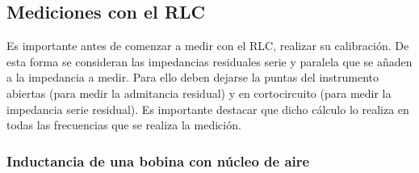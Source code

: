 \documentclass[a4paper,10pt]{article}
\begin{document}
	\subsection{Mediciones con el RLC}		
		\indent Es importante antes de comenzar a medir con el RLC, realizar su 
		calibraci\'on. De esta forma se consideran las impedancias residuales 
		serie y paralela que se a\~naden a la impedancia a medir. Para ello 
		deben dejarse la puntas del instrumento abiertas (para medir la 
		admitancia residual) y en cortocircuito (para medir la impedancia serie 
		residual). Es importante destacar que dicho cálculo lo realiza en 
		todas las frecuencias que se realiza la medición.

		\subsubsection{Inductancia de una bobina con n\'ucleo de aire}
		
\end{document}
